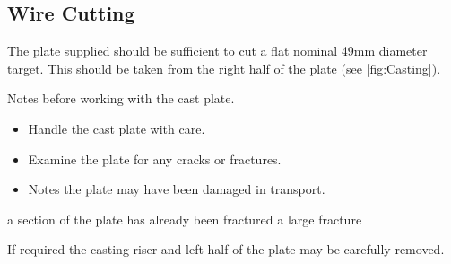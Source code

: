 \subsection{Wire Cutting}
The plate supplied should be sufficient to cut a flat nominal 49mm diameter target. This should be taken from the right half of the plate (see \ref{fig:Casting}). 

Notes before working with the cast plate.
\begin{itemize}
\item Handle the cast plate with care. 
\item Examine the plate for any cracks or fractures. 
\item Notes the plate may have been damaged in transport. 
\end{itemize}

a section of the plate has already been fractured a large fracture 

If required the casting riser and left half of the plate may be carefully removed.